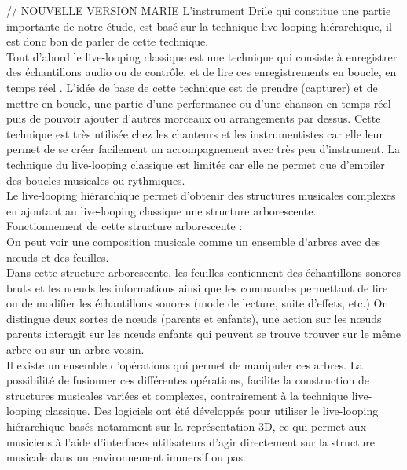 // NOUVELLE VERSION MARIE
L'instrument Drile qui constitue une partie importante de notre étude, est basé sur la technique live-looping hiérarchique, il est donc bon de parler de cette technique.\\
Tout d'abord le live-looping classique est une technique qui consiste à enregistrer des échantillons audio ou de contrôle, et de lire ces enregistrements en boucle, en temps réel . L'idée de base de cette technique est de prendre (capturer) et de mettre en boucle, une partie d'une performance ou d'une chanson en temps réel puis de pouvoir ajouter d'autres morceaux ou arrangements par dessus. Cette technique est très utilisée chez les chanteurs et les instrumentistes car elle leur permet de se créer facilement un accompagnement avec très peu d’instrument. La technique du live-looping classique est limitée car elle ne permet que d'empiler des boucles musicales ou rythmiques.\\
Le live-looping hiérarchique permet d'obtenir des structures musicales complexes en  ajoutant au live-looping classique une structure arborescente.\\ 
Fonctionnement de cette structure arborescente :\\
On peut voir une composition musicale comme un ensemble d'arbres avec des nœuds et des feuilles.\\
Dans cette structure arborescente, les feuilles contiennent des échantillons sonores bruts et les nœuds les informations ainsi que les commandes permettant de lire ou de modifier les échantillons sonores (mode de lecture, suite d'effets, etc.)
On distingue deux sortes de nœuds (parents et enfants), une action sur les nœuds parents interagit sur les nœuds enfants qui peuvent se trouve trouver sur le même arbre ou sur un arbre voisin. \\
Il existe un ensemble d'opérations qui permet de manipuler ces arbres. La possibilité de fusionner ces différentes opérations, facilite la construction de structures musicales variées et complexes, contrairement à la technique live-looping classique.
Des logiciels ont été développés pour utiliser le live-looping hiérarchique basés notamment sur la représentation 3D, ce qui permet aux musiciens à l'aide d'interfaces utilisateurs d'agir directement sur la structure musicale dans un environnement immersif ou pas.\\

